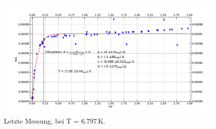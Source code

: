 \documentclass[german,  %
parskip=full,  %
]{scrartcl}
\begin{document}
\\\\
\begin{figure}[h!]
\centering
\includegraphics[width=\textwidth]{letzte_Messung.pdf}
\caption{Letzte Messung, bei T = $6.797$\,K.}
\end{figure}
\newpage
\end{document}
